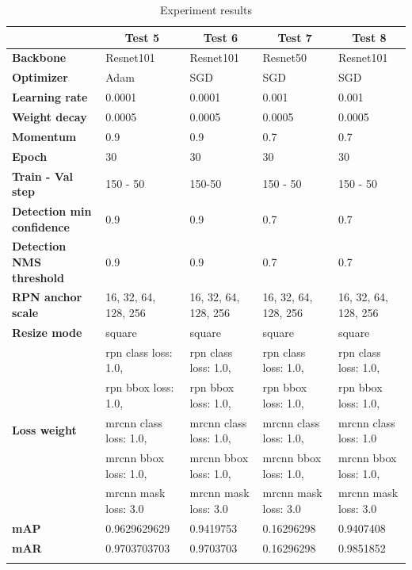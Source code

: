 	
	\begin{longtable}[c]{|p{}|p{}|p{}|p{}|p{}|}
		\hline
		& \multicolumn{1}{c|}{\textbf{Test 5}} & \multicolumn{1}{c|}{\textbf{Test 6}} & \multicolumn{1}{c|}{\textbf{Test 7}} & \multicolumn{1}{c|}{\textbf{Test 8}} \\ \hline
		\endhead
		\textbf{Backbone} & Resnet101 & Resnet101 & Resnet50 & Resnet101 \\ \hline
		\textbf{Optimizer} & Adam & SGD & SGD & SGD \\ \hline
		\textbf{Learning rate} & 0.0001 & 0.0001 & 0.001 & 0.001 \\ \hline
		\textbf{Weight decay} & 0.0005 & 0.0005 & 0.0005 & 0.0005 \\ \hline
		\textbf{Momentum} & 0.9 & 0.9 & 0.7 & 0.7 \\ \hline
		\textbf{Epoch} & 30 & 30 & 30 & 30 \\ \hline
		\textbf{Train - Val step} & 150 - 50 & 150-50 & 150 - 50 & 150 - 50 \\ \hline
		\textbf{Detection min confidence} & 0.9 & 0.9 & 0.7 & 0.7 \\ \hline
		\textbf{Detection NMS threshold} & 0.9 & 0.9 & 0.7 & 0.7 \\ \hline
		\textbf{RPN anchor scale} & 16, 32, 64, 128, 256 & 16, 32, 64, 128, 256 & 16, 32, 64, 128, 256 & 16, 32, 64, 128, 256 \\ \hline
		\textbf{Resize mode} & square & square & square & square \\ \hline
		
		\multirow{5}{*}{\textbf{Loss weight}} & rpn class loss: 1.0, & rpn class loss: 1.0, & rpn class loss: 1.0, & rpn class loss: 1.0, \\ \cline{2-5} 
		& rpn bbox loss: 1.0, & rpn bbox loss: 1.0, & rpn bbox loss: 1.0, & rpn bbox loss: 1.0, \\ \cline{2-5} 
		& mrcnn class loss: 1.0, & mrcnn class loss: 1.0, & mrcnn class loss: 1.0, & mrcnn class loss: 1.0 \\ \cline{2-5} 
		& mrcnn bbox loss: 1.0, & mrcnn bbox loss: 1.0, & mrcnn bbox loss: 1.0, & mrcnn bbox loss: 1.0, \\ \cline{2-5} 
		& mrcnn mask loss: 3.0 & mrcnn mask loss: 3.0 & mrcnn mask loss: 3.0 & mrcnn mask loss: 3.0 \\ \hline
		
		\textbf{mAP} & 0.9629629629 & 0.9419753 & 0.16296298 & 0.9407408 \\ \hline
		\textbf{mAR} & 0.9703703703 & 0.9703703 & 0.16296298 & 0.9851852 \\ \hline
	
	\caption{Experiment results}
	\label{table:exp2}
	\end{longtable}
	
